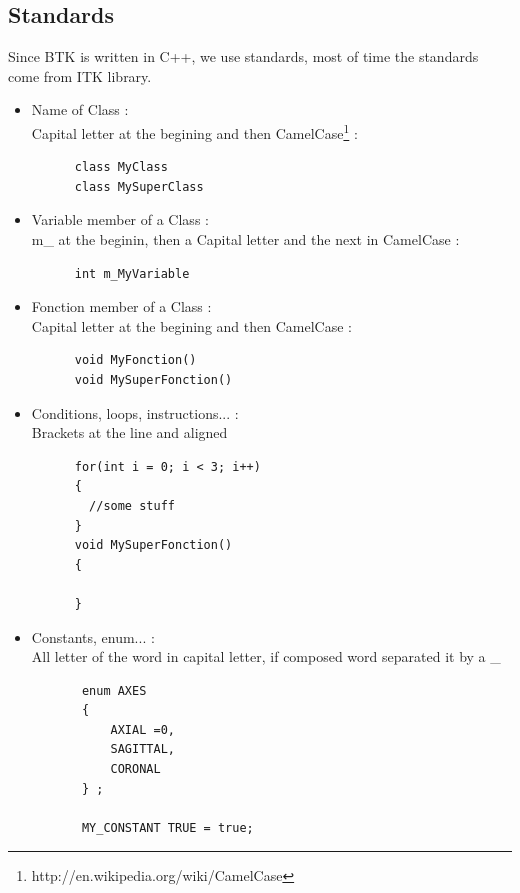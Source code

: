     \subsection{Standards}
    Since BTK is written in C++, we use standards, most of time the standards come from ITK library.\\

    \begin{itemize}
    \item Name of Class :\\
      Capital letter at the begining and then CamelCase\footnote{ http://en.wikipedia.org/wiki/CamelCase} :
      \begin{verbatim}
      class MyClass
      class MySuperClass
      \end{verbatim}

    \item Variable member of a Class :\\
      m\_ at the beginin, then a Capital letter and the next in CamelCase :
      \begin{verbatim}
      int m_MyVariable
      \end{verbatim}

    \item Fonction member of a Class :\\
      Capital letter at the begining and then CamelCase :
      \begin{verbatim}
      void MyFonction()
      void MySuperFonction()
      \end{verbatim}

    \item Conditions, loops, instructions... :\\
      Brackets at the line and aligned
      \begin{verbatim}
      for(int i = 0; i < 3; i++)
      {
        //some stuff
      }
      void MySuperFonction()
      {
      
      }
      \end{verbatim}

    \item Constants, enum... :\\
      All letter of the word in capital letter, if composed word separated it by a \_
      \begin{verbatim}
       enum AXES
       {
           AXIAL =0,
           SAGITTAL,
           CORONAL
       } ;

       MY_CONSTANT TRUE = true;
      \end{verbatim}

    \end{itemize}

